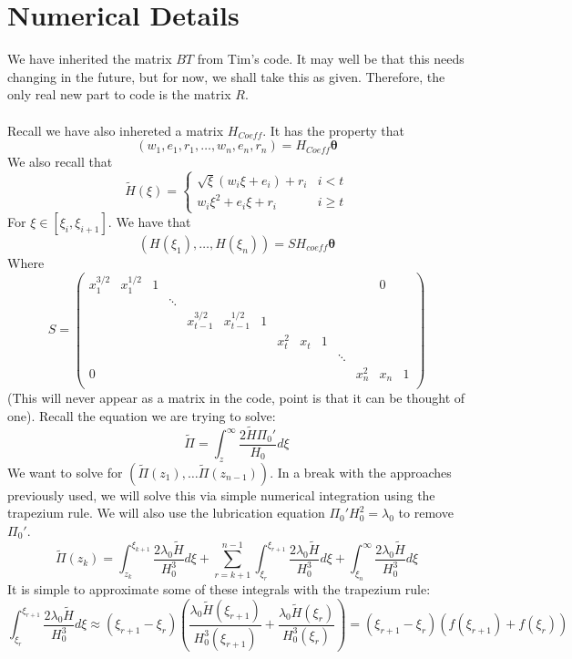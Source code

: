 \documentclass{article}
\newcommand{\bs}{\boldsymbol}                               %
\begin{document}
\section{Numerical Details}
We have inherited the matrix $BT$ from Tim's code. It may well be that this
needs changing in the future, but for now, we shall take this as given.
Therefore, the only real new part to code is the matrix $R$. 
\\
\\
Recall we have also inhereted a matrix $H_{Coeff}$. It has the property that
\[ ( w_1, e_1, r_1, \dots ,w_n, e_n, r_n ) = H_{Coeff} \bs{\theta} \]
We also recall that 
\[ \tilde{H}(\xi) = \left\{ \begin{array}{cc} \sqrt{\xi}(w_i\xi+e_i)+r_i &
i <t \\ w_i\xi^2+e_i\xi + r_i & i \geq t \end{array} \right. \]
For $\xi \in [\xi_i,\xi_{i+1}]$. We have that 
\[ (H(\xi_1), \dots, H(\xi_n) ) = S H_{coeff} \bs{\theta} \]
Where 
\[ S = \left( \begin{array}{*{14}{c}}
x_1^{3/2} & x_1^{1/2} & 1 & & & & & & & & & & 0 \\
 & & & \ddots \\
 & & & & x_{t-1}^{3/2} & x_{t-1}^{1/2} & 1 \\
 & & & & & & & x_{t}^{2} & x_{t} & 1 \\
 & & & & & & &  & & & \ddots \\
0 & & & & & & &  & & & &    x_{n}^{2} & x_{n} & 1 \\
\end{array} \right) \]
(This will never appear as a matrix in the code, point is that it can be
thought of one). Recall the equation we are trying to solve:
\[ \tilde{\Pi} = \int_z^{\infty} \frac{2 \tilde{H} \Pi_0'}{H_0} d\xi \]
We want to solve for $(\tilde{\Pi}(z_1), \dots \tilde{\Pi}(z_{n-1}))$.
In a break with the approaches previously used, we will solve this via
simple numerical integration using the trapezium rule. We will also use
the lubrication equation $\Pi_0'H_0^2=\lambda_0$ to remove $\Pi_0'$.
\[ \tilde{\Pi}(z_k) = \int_{z_k}^{\xi_{k+1}} \frac{2\lambda_0 \tilde{H}}{H_0^3} 
d\xi + \sum_{r=k+1}^{n-1}\int_{\xi_r}^{\xi_{r+1}} \frac{2\lambda_0 \tilde{H}}
{H_0^3} d\xi + \int_{\xi_n}^{\infty} \frac{2\lambda_0 \tilde{H}}
{H_0^3} d\xi\]
It is simple to approximate some of these integrals with the trapezium rule:
\[ \int_{\xi_r}^{\xi_{r+1}} \frac{2\lambda_0 \tilde{H}}{H_0^3} d\xi 
\approx (\xi_{r+1} - \xi_r)\left( \frac{\lambda_0\tilde{H}(\xi_{r+1})}
{H_0^3(\xi_{r+1})} + \frac{\lambda_0\tilde{H}(\xi_{r})}
{H_0^3(\xi_{r})} \right) =(\xi_{r+1} - \xi_r)(f(\xi_{r+1})+f(\xi_r)) \]
\end{document}
